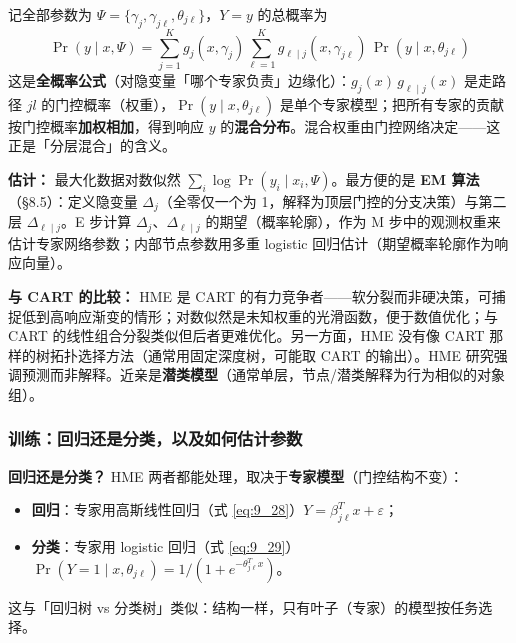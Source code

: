 记全部参数为 $\Psi = \{\gamma_j, \gamma_{j\ell}, \theta_{j\ell}\}$，$Y = y$ 的总概率为
\begin{equation}\label{eq:9_30}
    \Pr(y \mid x, \Psi) = \sum_{j=1}^{K} g_j(x, \gamma_j)\sum_{\ell=1}^{K} g_{\ell \mid j}(x, \gamma_{j\ell})\,\Pr(y \mid x, \theta_{j\ell})
\end{equation}
这是\textbf{全概率公式}（对隐变量「哪个专家负责」边缘化）：$g_j(x)\,g_{\ell \mid j}(x)$ 是走路径 $jl$ 的门控概率（权重），$\Pr(y \mid x, \theta_{j\ell})$ 是单个专家模型；把所有专家的贡献按门控概率\textbf{加权相加}，得到响应 $y$ 的\textbf{混合分布}。混合权重由门控网络决定——这正是「分层混合」的含义。

\textbf{估计：} 最大化数据对数似然 $\sum_i \log\Pr(y_i \mid x_i, \Psi)$。最方便的是 \textbf{EM 算法}（§8.5）：定义隐变量 $\Delta_j$（全零仅一个为 1，解释为顶层门控的分支决策）与第二层 $\Delta_{\ell \mid j}$。E 步计算 $\Delta_j$、$\Delta_{\ell\mid j}$ 的期望（概率轮廓），作为 M 步中的观测权重来估计专家网络参数；内部节点参数用多重 logistic 回归估计（期望概率轮廓作为响应向量）。

\textbf{与 CART 的比较：} HME 是 CART 的有力竞争者——软分裂而非硬决策，可捕捉低到高响应渐变的情形；对数似然是未知权重的光滑函数，便于数值优化；与 CART 的线性组合分裂类似但后者更难优化。另一方面，HME 没有像 CART 那样的树拓扑选择方法（通常用固定深度树，可能取 CART 的输出）。HME 研究强调预测而非解释。近亲是\textbf{潜类模型}（通常单层，节点/潜类解释为行为相似的对象组）。

\subsubsection{训练：回归还是分类，以及如何估计参数}

\textbf{回归还是分类？} HME 两者都能处理，取决于\textbf{专家模型}（门控结构不变）：
\begin{itemize}
    \item \textbf{回归}：专家用高斯线性回归（式 \eqref{eq:9_28}）$Y = \beta_{j\ell}^T x + \varepsilon$；
    \item \textbf{分类}：专家用 logistic 回归（式 \eqref{eq:9_29}）$\Pr(Y=1 \mid x, \theta_{j\ell}) = 1/(1+e^{-\theta_{j\ell}^T x})$。
\end{itemize}
这与「回归树 vs 分类树」类似：结构一样，只有叶子（专家）的模型按任务选择。


